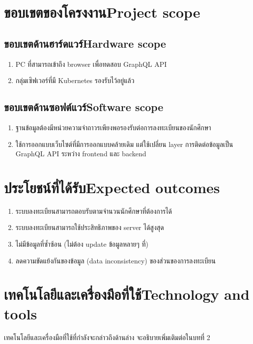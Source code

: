 \section{\ifcpe ขอบเขตของโครงงาน\else Project scope\fi}

\subsection{\ifcpe ขอบเขตด้านฮาร์ดแวร์\else Hardware scope\fi}
\begin{enumerate}
    \item PC ที่สามารถเข้าถึง browser เพื่อทดสอบ GraphQL API
    \item กลุ่มเซิฟเวอร์ที่มี Kubernetes รองรับไว้อยู่แล้ว
\end{enumerate}
\subsection{\ifcpe ขอบเขตด้านซอฟต์แวร์\else Software scope\fi}
\begin{enumerate}
    \item ฐานข้อมูลต้องมีหน่วยความจำถาวรเพียงพอรองรับต่อการลงทะเบียนของนักศึกษา
    \item ใช้การออกแบบเว็บไซต์ที่มีการออกแบบคล้ายเดิม แต่ใช้เปลี่ยน layer การติดต่อข้อมูลเป็น GraphQL API \cite{graphql} ระหว่าง frontend และ backend
\end{enumerate}
\section{\ifcpe ประโยชน์ที่ได้รับ\else Expected outcomes\fi}
\begin{enumerate}
    \item ระบบลงทะเบียนสามารถตอบรับตามจำนวนนักศึกษาที่ต้องการได้
    \item ระบบลงทะเบียนสามารถใช้ประสิทธิภาพของ server ได้สูงสุด
    \item ไม่มีข้อมูลที่ซ้ำซ้อน (ไม่ต้อง update ข้อมูลหลายๆ ที่)
    \item ลดความขัดแย้งกันของข้อมูล (data inconsistency) ของส่วนของการลงทะเบียน
\end{enumerate}

\section{\ifcpe เทคโนโลยีและเครื่องมือที่ใช้\else Technology and tools\fi}

เทคโนโลยีและเครื่องมือที่ใช้ที่กำลังจะกล่าวถึงด้านล่าง จะอธิบายเพิ่มเติมต่อในบทที่ 2

